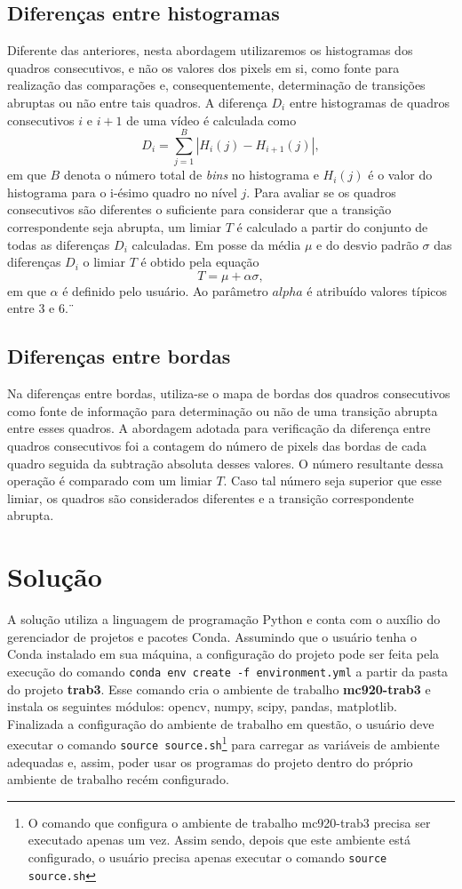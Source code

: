 \documentclass{article}
\begin{document}
\subsection{Diferenças entre histogramas}
Diferente das anteriores, nesta abordagem utilizaremos os histogramas dos quadros consecutivos, e não os valores dos pixels em si, como fonte para realização das comparações e, consequentemente, determinação de transições abruptas ou não entre tais quadros. A diferença $D_i$ entre histogramas de quadros consecutivos $i$ e $i+1$ de uma vídeo é calculada como
\[
D_i = \sum_{j=1}^{B} |H_i(j) - H_{i+1}(j)|,
\]
em que $B$ denota o número total de \textit{bins} no histograma e $H_i(j)$ é o valor do histograma para o i-ésimo quadro no nível $j$. Para avaliar se os quadros consecutivos são diferentes o suficiente para considerar que a transição correspondente seja abrupta, um limiar $T$ é calculado a partir do conjunto de todas as diferenças $D_i$ calculadas. Em posse da média $\mu$ e do desvio padrão $\sigma$ das diferenças $D_i$ o limiar $T$ é obtido pela equação
\[
T = \mu + \alpha\sigma,
\]
em que $\alpha$ é definido pelo usuário. Ao parâmetro $alpha$ é atribuído valores típicos entre $3$ e $6$.¨


\subsection{Diferenças entre bordas}
Na diferenças entre bordas, utiliza-se o mapa de bordas dos quadros consecutivos como fonte de informação para determinação ou não de uma transição abrupta entre esses quadros. A abordagem adotada para verificação da diferença entre quadros consecutivos foi a contagem do número de pixels das bordas de cada quadro seguida da subtração absoluta desses valores. O número resultante dessa operação é comparado com um limiar $T$. Caso tal número seja superior que esse limiar, os quadros são considerados diferentes e a transição correspondente abrupta. 
%
\section{Solução}
A solução utiliza a linguagem de programação Python e conta com o auxílio do gerenciador de projetos e pacotes Conda. Assumindo que o usuário tenha o Conda instalado em sua máquina, a configuração do projeto pode ser feita pela execução do comando \lstinline{conda env create -f environment.yml} a partir da pasta do projeto \textbf{trab3}. Esse comando cria o ambiente de trabalho \textbf{mc920-trab3} e instala os seguintes módulos: opencv, numpy, scipy, pandas, matplotlib. Finalizada a configuração do ambiente de trabalho em questão, o usuário deve executar o comando \lstinline{source source.sh}\footnote{O comando que configura o ambiente de trabalho mc920-trab3 precisa ser executado apenas um vez. Assim sendo, depois que este ambiente está configurado, o usuário precisa apenas executar o comando \lstinline{source source.sh}} para carregar as variáveis de ambiente adequadas e, assim, poder usar os programas do projeto dentro do próprio ambiente de trabalho recém configurado. 
\end{document}
